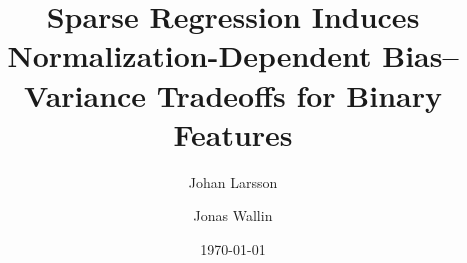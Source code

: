 


\title{Sparse Regression Induces Normalization-Dependent Bias--Variance Tradeoffs for Binary Features}

\author[1,*]{Johan Larsson}
\author[1]{Jonas Wallin}


\date{\today}

\usepackage[style=alphabetic]{biblatex}




\maketitle







\printbibliography




